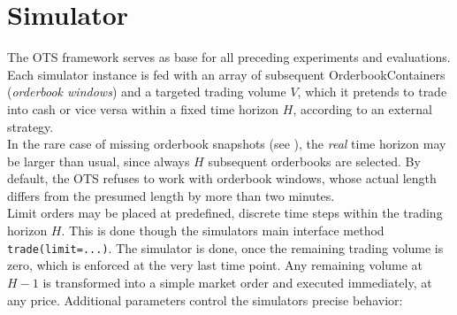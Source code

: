 \section{Simulator}
The \ac{OTS} framework serves as base for all preceding experiments and evaluations.
Each simulator instance is fed with an array of subsequent OrderbookContainers (\emph{orderbook windows}) and a targeted trading volume $V$, which it pretends to trade into cash or vice versa within a fixed time horizon $H$, according to an external strategy.\\

In the rare case of missing orderbook snapshots (see ), the \emph{real} time horizon may be larger than usual, since always $H$ subsequent orderbooks are selected. By default, the \ac{OTS} refuses to work with orderbook windows, whose actual length differs from the presumed length by more than two minutes.\\

Limit orders may be placed at predefined, discrete time steps within the trading horizon $H$. This is done though the simulators main interface method \lstinline!trade(limit=...)!. The simulator is done, once the remaining trading volume is zero, which is enforced at the very last time point. Any remaining volume at $H-1$ is transformed into a simple market order and executed immediately, at any price. Additional parameters control the simulators precise behavior:

